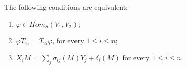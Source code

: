 \documentclass[10pt,a4paper]{amsart}
\begin{document}
	\begin{theorem} 	\label{Pro ring of endo}
		The following conditions are equivalent: 
		\begin{enumerate}
			\item[(i)] $\varphi \in Hom_S(V_1,V_2)$;
			\item[(ii)]  $\varphi T_{1i}=T_{2i} \varphi$, for every $1\le i \le n$;
			\item[(iii)] $X_iM=\sum_j\sigma_{ij}(M)Y_j+ \delta_i(M)$ for every $1\le i \le n$.
		\end{enumerate}
	\end{theorem}
\end{document}
